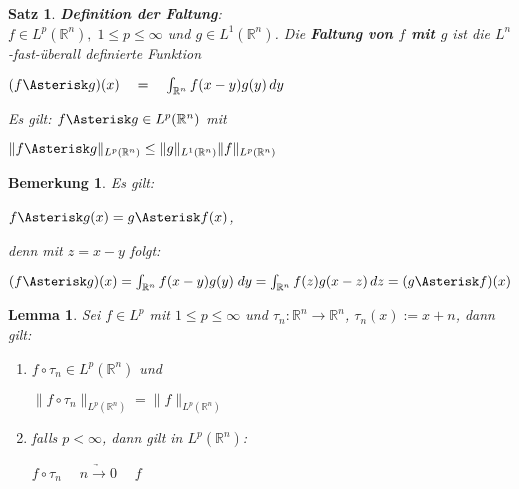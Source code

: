 \documentclass[11pt]{memoir}
\theoremstyle{changebreak}
\newtheorem{Bemerkung}{Bemerkung}[chapter]
\newtheorem{Lemma}{Lemma}[chapter]
\newtheorem{Satz}{Satz}[chapter]
\newcommand{\ffg}{f \Asterisk g}
\begin{document}
\begin{Satz}
\emph{\textbf{Definition der Faltung}}: \\
$f \in L^p(\mathbb R^n), \; 1 \leq p \leq \infty$ und $g \in L^1(\mathbb R^n)$.
Die \textbf{Faltung von $f$ mit $g$} ist die $L^n$-fast-überall definierte Funktion
\begin{center}
	$(f \Asterisk g)(x) \quad = \quad \int_{\mathbb R^n} f(x-y)g(y) \,dy$
\end{center}
Es gilt: $f \Asterisk g \in L^p(\mathbb R^n)$ mit
\begin{center}
	$\| \ffg \|_{L^p(\mathbb R^n)} \leq \|g\|_{L^1(\mathbb R^n)} \|f \|_{L^p(\mathbb R^n)}$
\end{center}
\end{Satz}


\begin{Bemerkung}
Es gilt:
\begin{center}
	$\ffg(x) = g \Asterisk f(x)$,
\end{center}
denn mit $z = x -y$ folgt: 
\begin{center}
	$(\ffg)(x) = \int_{\mathbb R^n} f(x -y) g(y) \; dy = \int_{\mathbb R^n} f(z) g(x - z) \, dz = (g \Asterisk f)(x)$
\end{center}
\end{Bemerkung}


\begin{Lemma}
Sei $f \in L^p$ mit $1 \leq p \leq \infty$ und $\tau_n : \mathbb R^n \rightarrow \mathbb R^n$, $\tau_n(x) := x + n$, dann gilt:
\begin{enumerate} 
	\item $f \circ \tau_n \in L^p(\mathbb R^n)$ und 
	\begin{center}
		$\| f \circ \tau_n\|_{L^p(\mathbb R^n)} = \|f\|_{L^p(\mathbb R^n)}$
	\end{center}
	\item falls $p < \infty$, dann gilt in $L^p(\mathbb R^n)$:
	\begin{center}
		$f \circ \tau_n \quad \underrightarrow{\;n \rightarrow 0\;} \quad f$  
	\end{center}
\end{enumerate}
\end{Lemma}
\end{document}
